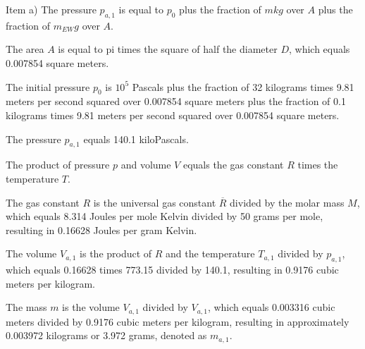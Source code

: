 Item a) The pressure \( p_{a,1} \) is equal to \( p_0 \) plus the fraction of \( m k g \) over \( A \) plus the fraction of \( m_{EW} g \) over \( A \).

The area \( A \) is equal to pi times the square of half the diameter \( D \), which equals 0.007854 square meters.

The initial pressure \( p_0 \) is \( 10^5 \) Pascals plus the fraction of 32 kilograms times 9.81 meters per second squared over 0.007854 square meters plus the fraction of 0.1 kilograms times 9.81 meters per second squared over 0.007854 square meters.

The pressure \( p_{a,1} \) equals 140.1 kiloPascals.

The product of pressure \( p \) and volume \( V \) equals the gas constant \( R \) times the temperature \( T \).

The gas constant \( R \) is the universal gas constant \( \overline{R} \) divided by the molar mass \( M \), which equals 8.314 Joules per mole Kelvin divided by 50 grams per mole, resulting in 0.16628 Joules per gram Kelvin.

The volume \( V_{a,1} \) is the product of \( R \) and the temperature \( T_{a,1} \) divided by \( p_{a,1} \), which equals 0.16628 times 773.15 divided by 140.1, resulting in 0.9176 cubic meters per kilogram.

The mass \( m \) is the volume \( V_{a,1} \) divided by \( V_{a,1} \), which equals 0.003316 cubic meters divided by 0.9176 cubic meters per kilogram, resulting in approximately 0.003972 kilograms or 3.972 grams, denoted as \( m_{a,1} \).